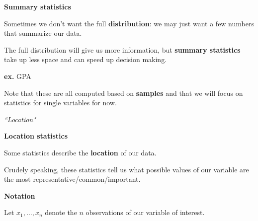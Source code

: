 \documentclass[ignorenonframetext,]{beamer}
\begin{document}
\begin{frame}{}
\protect\hypertarget{section-26}{}

\textbf{\large Summary statistics}

\vspace{2ex}

Sometimes we don't want the full \textbf{distribution}: we may just want
a few numbers that summarize our data.

\vspace{2ex}

The full distribution will give us more information, but \textbf{summary
statistics} take up less space and can speed up decision making.

\vspace{2ex}

\textbf{ex.} GPA\pause

\vspace{2ex}

Note that these are all computed based on \textbf{samples} and that we
will focus on statistics for single variables for now.

\end{frame}

\begin{frame}[standout]{}
\protect\hypertarget{section-27}{}

\begin{center}
        
    \vspace{2.3em}
    \color{white}\textit{\Huge\gar ``Location"}
\end{center}

\end{frame}

\begin{frame}{}
\protect\hypertarget{section-28}{}

\textbf{\large Location statistics}

\vspace{2ex}

Some statistics describe the \textbf{location} of our data.

\vspace{2ex}

Crudely speaking, these statistics tell us what possible values of our
variable are the most representative/common/important.

\end{frame}

\begin{frame}{}
\protect\hypertarget{section-29}{}

\textbf{\large Notation}

\vspace{2ex}

Let \(x_1,\ldots, x_n\) denote the \(n\) observations of our variable of
interest.

\end{frame}
\end{document}
